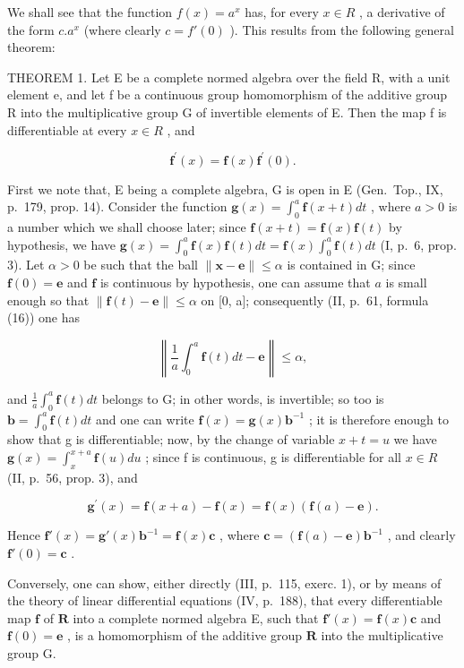 We shall see that the function \(f(x) = a^{x}\) has, for every \(x \in R\) , a derivative of the form \(c.a^{x}\) (where clearly \(c = f'(0)\) ). This results from the following general theorem:

THEOREM 1. Let E be a complete normed algebra over the field R, with a unit element e, and let f be a continuous group homomorphism of the additive group R into the multiplicative group G of invertible elements of E. Then the map f is differentiable at every \(x \in R\) , and

\[
\mathbf {f} ^ {\prime} (x) = \mathbf {f} (x) \mathbf {f} ^ {\prime} (0).\tag{1}
\]

First we note that, E being a complete algebra, G is open in E (Gen.~Top., IX, p.~179, prop. 14). Consider the function \(\mathbf{g}(x) = \int_0^a \mathbf{f}(x + t) dt\) , where \(a > 0\) is a number which we shall choose later; since \(\mathbf{f}(x + t) = \mathbf{f}(x) \mathbf{f}(t)\) by hypothesis, we have \(\mathbf{g}(x) = \int_0^a \mathbf{f}(x) \mathbf{f}(t) dt = \mathbf{f}(x) \int_0^a \mathbf{f}(t) dt\) (I, p.~6, prop. 3). Let \(\alpha > 0\) be such that the ball \(\| \mathbf{x} - \mathbf{e} \| \leqslant \alpha\) is contained in G; since \(\mathbf{f}(0) = \mathbf{e}\) and \(\mathbf{f}\) is continuous by hypothesis, one can assume that \(a\) is small enough so that \(\| \mathbf{f}(t) - \mathbf{e} \| \leqslant \alpha\) on {[}0, a{]}; consequently (II, p.~61, formula (16)) one has

\[
\left\| \frac {1}{a} \int_ {0} ^ {a} \mathbf {f} (t) d t - \mathbf {e} \right\| \leqslant \alpha ,
\]

and \(\frac{1}{a}\int_{0}^{a}\mathbf{f}(t)dt\) belongs to G; in other words, is invertible; so too is \(\mathbf{b}=\int_{0}^{a}\mathbf{f}(t)dt\) and one can write \(\mathbf{f}(x)=\mathbf{g}(x)\mathbf{b}^{-1}\) ; it is therefore enough to show that g is differentiable; now, by the change of variable \(x+t=u\) we have \(\mathbf{g}(x)=\int_{x}^{x+a}\mathbf{f}(u)du\) ; since f is continuous, g is differentiable for all \(x\in R\) (II, p.~56, prop. 3), and

\[
\mathbf {g} ^ {\prime} (x) = \mathbf {f} (x + a) - \mathbf {f} (x) = \mathbf {f} (x) (\mathbf {f} (a) - \mathbf {e}).
\]

Hence \(\mathbf{f}'(x) = \mathbf{g}'(x)\mathbf{b}^{-1} = \mathbf{f}(x)\mathbf{c}\) , where \(\mathbf{c} = (\mathbf{f}(a) - \mathbf{e})\mathbf{b}^{-1}\) , and clearly \(\mathbf{f}'(0) = \mathbf{c}\) .

Conversely, one can show, either directly (III, p.~115, exerc. 1), or by means of the theory of linear differential equations (IV, p.~188), that every differentiable map \(\mathbf{f}\) of \(\mathbf{R}\) into a complete normed algebra E, such that \(\mathbf{f}'(x) = \mathbf{f}(x)\mathbf{c}\) and \(\mathbf{f}(0) = \mathbf{e}\) , is a homomorphism of the additive group \(\mathbf{R}\) into the multiplicative group G.

